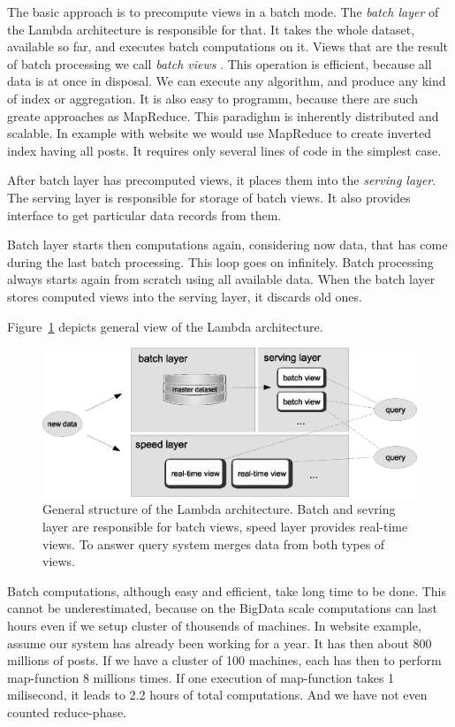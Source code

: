 The basic approach is to precompute views in a batch mode.
The \textit{batch layer}  of the Lambda architecture is responsible for that.
It takes the whole dataset, available so far, and executes batch computations on it.
Views that are the result of batch processing we call \textit{batch views} . 
This operation is efficient, because all data is at once in disposal.
We can execute any algorithm, and produce any kind of index or aggregation.
It is also easy to programm, because there are such greate approaches as MapReduce.
This paradighm is inherently distributed and scalable.
In example with website we would use MapReduce to create inverted index having all posts.
It requires only several lines of code in the simplest case.

After batch layer has precomputed views, it places them into the \textit{serving layer}.
The serving layer is responsible for storage of batch views.
It also provides interface to get particular data records from them. 

Batch layer starts then computations again, considering now data, that has come during the last batch processing.
This loop goes on infinitely.
Batch processing always starts again from scratch using all available data.
When the batch layer stores computed views into the serving layer, it discards old ones.

Figure~\ref{fig:lambda_architecture} depicts general view of the Lambda architecture. 

\begin{figure}
  \centering
  \includegraphics [width=1.0\textwidth]{images/LambdaArchitecture}
  \caption{General structure of the Lambda architecture. Batch and sevring layer are responsible for batch views, speed layer provides real-time views. To answer query system merges data from both types of views.}
  \label{fig:lambda_architecture}
\end{figure}

Batch computations, although easy and efficient, take long time to be done.
This cannot be underestimated, because on the BigData scale computations can last hours even if we setup cluster of thousends of machines.
In website example, assume our system has already been working for a year.
It has then about 800 millions of posts.
If we have a cluster of 100 machines, each has then to perform map-function 8 millions times.
If one execution of map-function takes 1 milisecond, it leads to 2.2 hours of total computations.
And we have not even counted reduce-phase.


